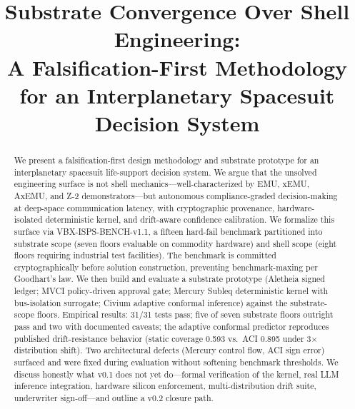 \documentclass[conference]{IEEEtran}
\theoremstyle{definition}
\theoremstyle{plain}
\theoremstyle{remark}
\begin{document}
\title{Substrate Convergence Over Shell Engineering:\\
A Falsification-First Methodology for an Interplanetary Spacesuit Decision System}

\author{
}

\maketitle

\begin{abstract}
We present a falsification-first design methodology and substrate prototype for an interplanetary spacesuit life-support decision system. We argue that the unsolved engineering surface is not shell mechanics---well-characterized by EMU, xEMU, AxEMU, and Z-2 demonstrators---but autonomous compliance-graded decision-making at deep-space communication latency, with cryptographic provenance, hardware-isolated deterministic kernel, and drift-aware confidence calibration. We formalize this surface via VBX-ISPS-BENCH-v1.1, a fifteen hard-fail benchmark partitioned into substrate scope (seven floors evaluable on commodity hardware) and shell scope (eight floors requiring industrial test facilities). The benchmark is committed cryptographically before solution construction, preventing benchmark-maxing per Goodhart's law. We then build and evaluate a substrate prototype (Aletheia signed ledger; MVCI policy-driven approval gate; Mercury Subleq deterministic kernel with bus-isolation surrogate; Civium adaptive conformal inference) against the substrate-scope floors. Empirical results: 31/31 tests pass; five of seven substrate floors outright pass and two with documented caveats; the adaptive conformal predictor reproduces published drift-resistance behavior (static coverage 0.593 vs.\ ACI 0.895 under 3$\times$ distribution shift). Two architectural defects (Mercury control flow, ACI sign error) surfaced and were fixed during evaluation without softening benchmark thresholds. We discuss honestly what v0.1 does not yet do---formal verification of the kernel, real LLM inference integration, hardware silicon enforcement, multi-distribution drift suite, underwriter sign-off---and outline a v0.2 closure path.
\end{abstract}
\end{document}
